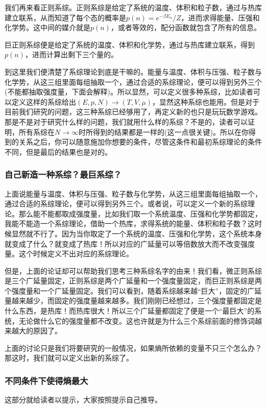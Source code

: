 \documentclass[11pt]{ctexart}
\begin{document}
我们再来看正则系综。正则系综是给定了系统的温度、体积和粒子数，通过与热库建立联系，从而知道了每个态的概率是$p(n) = e^{-\beta E_n}/Z$，进而求得能量、压强和化学势。这中间的媒介就是$p(n)$，或者等效的，配分函数就包含了所有的信息。

巨正则系综便是给定了系统的温度、体积和化学势，通过与热库建立联系，得到$p(n)$，进而计算出剩下三个量的。

到这里我们便清楚了系综理论到底是干嘛的。能量与温度、体积与压强、粒子数与化学势，从这三组里面每组抽取一个，通过合适的系综理论，便可以得到另外三个(不能都抽取强度量，下面会解释)。所以显然，可以定义很多种系综，比如读者可以定义这样的系综$\text{给出}(E,p,N)\rightarrow (T,V,\mu)$，显然这种系综也能用。但是对于目前我们研究的问题，这三种系综已经够用了，再定义新的也只是玩玩数学游戏。那是不是对于研究什么样的问题，我们就用什么样的系综？不是的，读者可以证明，所有系综在$N\rightarrow \infty$时所得到的结果都是一样的(这一点很关键)。所以在你得到的关系之后，你可以随意施加你想要的条件，尽管这条件和最初系综理论的条件不同，但是最后的结果也是对的。

\subsubsection{自己新造一种系综？最巨系综？}
上面说能量与温度、体积与压强、粒子数与化学势，从这三组里面每组抽取一个，通过合适的系综理论，便可以得到另外三个。或者说，可以定义一个新的系综理论。那么能不能都取成强度量，比如我们取一个系统温度、压强和化学势都固定，我能不能造一个系综理论，借助一个热库，求得系统的能量、体积和粒子数？这时候显然就不行了。因为当你取定了一个系统的温度、压强和化学势，这个系统本身就变成了什么？就变成了热库！所以对应的广延量可以等倍数放大而不改变强度量。这个时候定义不出对应的系综理论。

但是，上面的论证却可以帮助我们思考三种系综名字的由来！我们看，微正则系综是三个广延量固定，正则系综是两个广延量和一个强度量固定，而巨正则系综是两个强度量和一个广延量固定。我们可以看到，随着系综越来越“巨大”，固定的广延量越来越少，而固定的强度量越来越多。我们刚刚已经想过，三个强度量都固定是什么东西，是热库！而热库很大！所以三个广延量都固定了便是一个“最巨大”的系统，无论做什么它的强度量都不改变。这也许就是为什么三个系综前面的修饰词越来越大的原因了。

上面的讨论只是我们将要研究的一般情况，如果熵所依赖的变量不只三个怎么办？那这时，我们就可以定义出新的系综了。

\subsubsection{不同条件下使得熵最大}
这部分就给读者以提示，大家按照提示自己推导。
\end{document}

